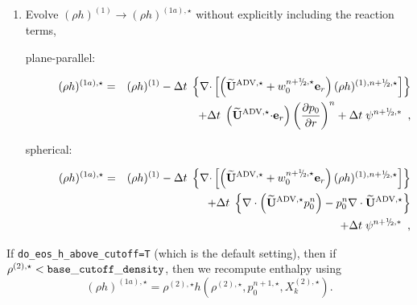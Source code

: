 \begin{description}
\begin{enumerate}
\begin{enumerate}
  \item Evolve $(\rho h)^{(1)} \rightarrow (\rho h)^{(1a),\star}$ without
  explicitly including the reaction terms,

\begin{description}
\item[plane-parallel:]

  \begin{eqnarray}
  (\rho h)^{(1a),\star} &=& (\rho h)^{(1)} - \dt \; \left\{ \nablab
      \cdotb \left[ \left(\uadvone+w_0^{\nph,\star} \er\right) (\rho
      h)^{(1),\nph,\star} \right] \right\} \nonumber \\ && + \dt \;
    \left(\uadvone \cdotb \er\right) \left(\frac{\partial
      p_0}{\partial r} \right)^{n} + \dt \; \psi^{\nph,*} \enskip ,
  \end{eqnarray}

\item[spherical:]

  \begin{eqnarray}
  (\rho h)^{(1a),\star} &=& (\rho h)^{(1)} - \dt \; \left\{ \nablab
      \cdotb \left[ \left(\uadvone+w_0^{\nph,\star} \er\right) (\rho
      h)^{(1),\nph,\star} \right] \right\} \nonumber \\ 
    && + \dt \; \left \{ \nabla \cdot \left (\uadvone p_0^{n} \right ) 
       - p_0^{n} \nabla \cdot \uadvone \right \} \nonumber \\
    && + \dt \; \psi^{\nph,*} \enskip ,
  \end{eqnarray}

\end{description}

\end{enumerate}

If {\tt do\_eos\_h\_above\_cutoff=T} (which is the default setting), then if
$\rho^{(2),\star} < {\tt base\_cutoff\_density}$, then we recompute enthalpy using
\begin{equation}
(\rho h)^{(1a),\star} = \rho^{(2),\star}h\left(\rho^{(2),\star},p_0^{n+1,\star},X_k^{(2),\star}\right).
\end{equation}




\end{enumerate}
\end{description}
